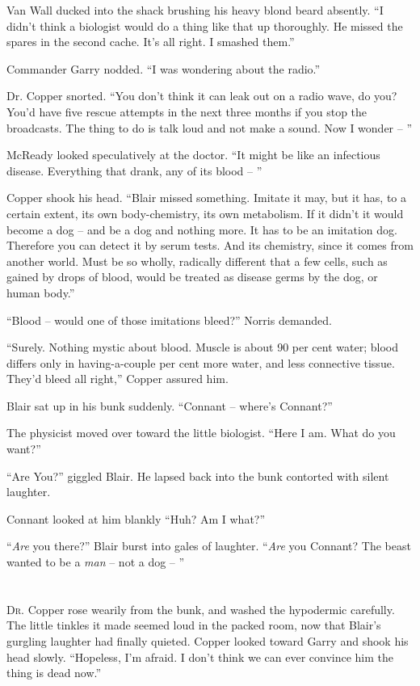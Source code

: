 \documentclass[ebook,oneside,11pt]{memoir}				%
\begin{document}
Van Wall ducked into the shack brushing his heavy blond beard absently. ``I didn't think a biologist would do a thing like that up thoroughly. He missed the spares in the second cache. It's all right. I smashed them.''

Commander Garry nodded. ``I was wondering about the radio.''

Dr. Copper snorted. ``You don't think it can leak out on a radio wave, do you? You'd have five rescue attempts in the next three months if you stop the broadcasts. The thing to do is talk loud and not make a sound. Now I wonder -- ''

McReady looked speculatively at the doctor. ``It might be like an infectious disease. Everything that drank, any of its blood -- ''

Copper shook his head. ``Blair missed something. Imitate it may, but it has, to a certain extent, its own body-chemistry, its own metabolism. If it didn't it would become a dog -- and be a dog and nothing more. It has to be an imitation dog. Therefore you can detect it by serum tests. And its chemistry, since it comes from another world. Must be so wholly, radically different that a few cells, such as gained by drops of blood, would be treated as disease germs by the dog, or human body.''

``Blood -- would one of those imitations bleed?'' Norris demanded.

``Surely. Nothing mystic about blood. Muscle is about 90 per cent water; blood differs only in having-a-couple per cent more water, and less connective tissue. They'd bleed all right,'' Copper assured him.

Blair sat up in his bunk suddenly. ``Connant -- where's Connant?''

The physicist moved over toward the little biologist. ``Here I am. What do you want?''

``Are You?'' giggled Blair. He lapsed back into the bunk contorted with silent laughter.

Connant looked at him blankly ``Huh? Am I what?''

``\emph{Are} you there?'' Blair burst into gales of laughter. ``\emph{Are} you Connant? The beast wanted to be a \emph{man} -- not a dog -- '' 

\chapter[Chapter 7]{}
\lettrine[lines=3,findent=2pt,nindent=2pt]{D}{r.} Copper rose wearily from the bunk, and washed the hypodermic carefully. The little tinkles it made seemed loud in the packed room, now that Blair's gurgling laughter had finally quieted. Copper looked toward Garry and shook his head slowly. ``Hopeless, I'm afraid. I don't think we can ever convince him the thing is dead now.''
\end{document}
